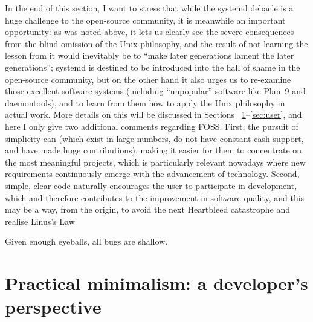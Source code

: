 In the end of this section, I want to stress that while the systemd debacle
is a huge challenge to the open-source community, it is meanwhile an important
opportunity: as was noted above, it lets us clearly see the severe consequences
from the blind omission of the Unix philosophy, and the result of not learning
the lesson from it would inevitably be to ``make later generations lament the
later generations''; systemd is destined to be introduced into the hall of
shame in the open-source community, but on the other hand it also urges us to
re-examine those excellent software systems (including ``unpopular'' software
like Plan~9 and daemontools), and to learn from them how to apply the Unix
philosophy in actual work.  More details on this will be discussed in Sections~%
\ref{sec:devel}--\ref{sec:user}, and here I only give two additional comments
regarding FOSS.  First, the pursuit of simplicity can  (which exist in large numbers, do not have constant
cash support, and have made huge contributions), making it easier for them to
concentrate on the most meaningful projects, which is particularly relevant
nowadays where new requirements continuously emerge with the advancement of
technology.  Second, simple, clear code naturally encourages the user to
participate in development, which  and therefore contributes to the improvement in software quality,
and this may be a way, from the origin, to avoid the next Heartbleed
catastrophe and realise Linus's Law
\begin{quoting}
	Given enough eyeballs, all bugs are shallow.
\end{quoting}

\section{Practical minimalism: a developer's perspective}\label{sec:devel}

